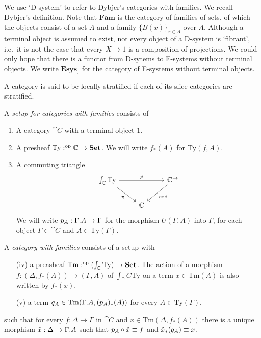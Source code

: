 We use `D-system' to refer to Dybjer's categories with families. We recall
Dybjer's definition. Note that $\mathbf{Fam}$ is the category of families of
sets, of which the objects consist of a set $A$ and a family $\{B(x)\}_{x\in A}$
over $A$. Although a terminal object is assumed to exist, not every object 
of a D-system is `fibrant', i.e.~it is
not the case that every $X\to 1$ is a composition of projections.
We could only hope that there is a functor from D-sytems to E-systems without
terminal objects. We write $\mathbf{Esys}_{\circ}$ for the category of E-systems
without terminal objects.

\begin{defn}
A category is said to be locally stratified if each of its slice categories
are stratified.
\end{defn}

\begin{defn}
A \emph{setup for categories with families} consists of
\begin{enumerate}
\item A category $\cat{C}$ with a terminal object $1$.
\item A presheaf $\mathrm{Ty}:^{\mathrm{op}}{\mathbb{C}}\to\mathbf{Set}$. We will write
$f_\ast(A)$ for $\mathrm{Ty}(f,A)$. 
\item A commuting triangle
\begin{equation*}
\begin{tikzcd}
\int_\cat{C}\mathrm{Ty} \arrow[dr,swap,"\pi"] \arrow[rr,"p"] & & \cat{C}^{\to} \arrow[dl,"\mathrm{cod}"] \\
& \cat{C}
\end{tikzcd}
\end{equation*} 
We will write $p_A:\ctxext{\Gamma}{A}\to\Gamma$
for the morphism $U(\Gamma,A)$ into $\Gamma$, for each object $\Gamma\in\cat{C}$ and
$A\in\mathrm{Ty}(\Gamma)$.
\end{enumerate}
\end{defn}

\begin{defn}
A \emph{category with families} consists of a setup with
\begin{enumerate}
\item[(iv)] a preasheaf $\mathrm{Tm}:^{\mathrm{op}}{(\int_\mathbb{C}\mathrm{Ty})}\to\mathbf{Set}$.
The action of a morphism $f:(\Delta,f_\ast(A))\to(\Gamma,A)$ of $\int_\cat{C}\mathrm{Ty}$
on a term $x\in \mathrm{Tm}(A)$ is also written by $f_\ast(x)$.
\item[(v)] a term $q_A\in\mathrm{Tm}(\ctxext{\Gamma}{A},(p_A)_\ast(A))$ for every
$A\in\mathrm{Ty}(\Gamma)$, 
\end{enumerate}
such that for every $f:\Delta\to\Gamma$ in $\cat{C}$ and 
$x\in \mathrm{Tm}(\Delta,f_\ast(A))$ there is a unique morphism 
$\tilde{x}:\Delta\to \ctxext{\Gamma}{A}$ such that $p_A\circ\tilde{x}\equiv f$ and 
$\tilde{x}_\ast(q_A)\equiv x$.
\end{defn}

